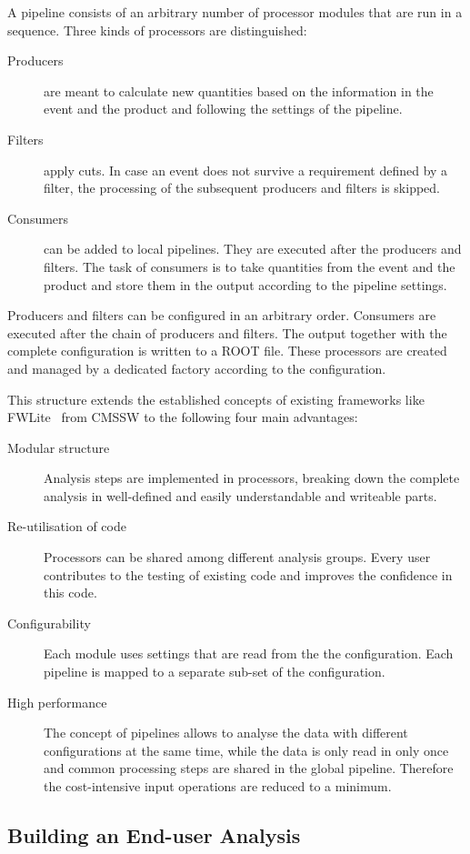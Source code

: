 \documentclass[a4paper, oneside, 10pt]{scrartcl}
\begin{document}
A pipeline consists of an arbitrary number of processor modules that are run in a sequence. Three kinds of processors are distinguished:
\begin{description}
\item[Producers] are meant to calculate new quantities based on the information in the event and the product and following the settings of the pipeline.
\item[Filters] apply cuts. In case an event does not survive a requirement defined by a filter, the processing of the subsequent producers and filters is skipped.
\item[Consumers] can be added to local pipelines. They are executed after the producers and filters. The task of consumers is to take quantities from the event and the product and store them in the output according to the pipeline settings.
\end{description}
Producers and filters can be configured in an arbitrary order. Consumers are executed after the chain of producers and filters. The output together with the complete configuration is written to a ROOT file. These processors are created and managed by a dedicated factory according to the configuration.

This structure extends the established concepts of existing frameworks like FWLite~\cite{FWLite} from CMSSW to the following four main advantages:
\begin{description}
\item[Modular structure] Analysis steps are implemented in processors, breaking down the complete analysis in well-defined and easily understandable and writeable parts.
\item[Re-utilisation of code] Processors can be shared among different analysis groups. Every user contributes to the testing of existing code and improves the confidence in this code.
\item[Configurability] Each module uses settings that are read from the the configuration. Each pipeline is mapped to a separate sub-set of the configuration.
\item[High performance] The concept of pipelines allows to analyse the data with different configurations at the same time, while the data is only read in only once and common processing steps are shared in the global pipeline. Therefore the cost-intensive input operations are reduced to a minimum.
\end{description}


\subsection{Building an End-user Analysis \label{section_artus_analysis}}
\end{document}
